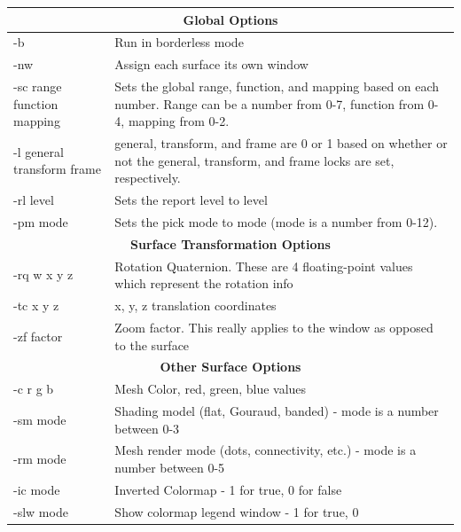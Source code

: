 \begin{table}[htbp]
\begin{center}
\begin{tabular}{|l|p{4in}|} \hline
        \multicolumn{2}{|c||}{\textbf{Global Options}} \\ \hline
        -b              &       Run \map{} in borderless mode \\
        -nw             &       Assign each surface its own window \\ \hline
        -sc range function mapping   &   Sets the global range, function,
        and mapping based on each number. 
                                         Range can be a number from 0-7,
        function from 0-4, mapping from 0-2. \\ \hline 
        -l general transform frame   &   general, transform, and frame are
        0 or 1 based on whether or not 
                                         the general, transform, and frame
        locks are set, respectively. \\ \hline 
        -rl level       &       Sets the report level to level \\ \hline
        -pm mode        &       Sets the pick mode to mode (mode is a
        number from 0-12). \\ \hline 
        \multicolumn{2}{|c||}{\textbf{Surface Transformation Options}} \\ \hline
        -rq w x y z     &       Rotation Quaternion.  These are 4
        floating-point values which represent the rotation info \\ 
        -tc x y z       &       x, y, z translation coordinates \\ \hline
        -zf factor      &       Zoom factor.  This really applies to the
        window as opposed to the surface\\ \hline 
        \multicolumn{2}{|c||}{\textbf{Other Surface Options}} \\ \hline
        -c r g b        &       Mesh Color, red, green, blue values \\
        -sm mode        &       Shading model (flat, Gouraud, banded) -
        mode is a number between 0-3 \\ 
        -rm mode        &       Mesh render mode (dots, connectivity, etc.)
        - mode is a number between 0-5 \\ 
        -ic mode        &       Inverted Colormap - 1 for true, 0 for false\\
        -slw mode       &       Show colormap legend window - 1 for true, 0

\end{tabular}
\end{center}
\end{table}
